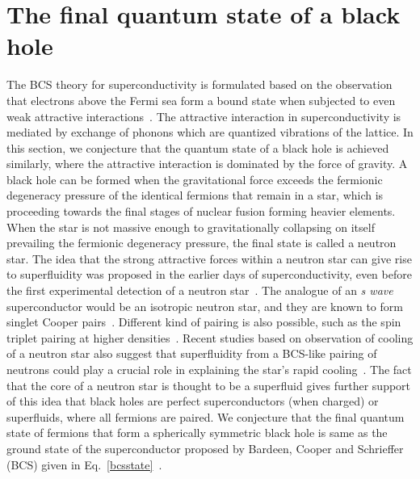 \documentclass[12pt,letterpaper,aps,onecolumn,superscriptaddress,floatfix,notitlepage]{revtex4-1}
\begin{document}
	\section{The final quantum state of a black hole\label{finalstate}}
	The BCS theory for superconductivity is formulated based on the observation that electrons above the Fermi sea form a bound state when subjected to even weak attractive interactions~\cite{annett2004superconductivity}. The attractive interaction in superconductivity is mediated by exchange of phonons which are quantized vibrations of the lattice. In this section, we conjecture that the quantum state of a black hole is achieved similarly, where the attractive interaction is dominated by the force of gravity. A black hole can be formed when the gravitational force exceeds the fermionic degeneracy pressure of the identical fermions that remain in a star, which is proceeding towards the final stages of nuclear fusion forming heavier elements.  When the star is not massive enough to gravitationally collapsing on itself prevailing the fermionic degeneracy pressure, the final state is called a neutron star. The idea that the strong attractive forces within a neutron star can give rise to superfluidity was proposed in the earlier days of superconductivity, even before the first experimental detection of a neutron star~\cite{neutron1}. The analogue of an \textit{s wave} superconductor would be an isotropic neutron star, and they are known to form singlet Cooper pairs~\cite{superfluidity,stellar}. Different kind of pairing is also possible, such as the spin triplet pairing at higher densities~\cite{stellar}.  Recent studies based on observation of cooling of a neutron star also suggest that superfluidity from a BCS-like pairing of neutrons could play a crucial role in explaining the star's rapid cooling~\cite{neutron2}. The fact that the core of a neutron star is thought to be a superfluid gives further support of this idea that black holes are perfect superconductors (when charged) or superfluids, where all fermions are paired. We conjecture that the final quantum state of fermions that form a spherically symmetric black hole is same as the ground state of the superconductor proposed by Bardeen, Cooper and Schrieffer (BCS) given in Eq.~\eqref{bcsstate}~\cite{BCS}.
	
\end{document}
